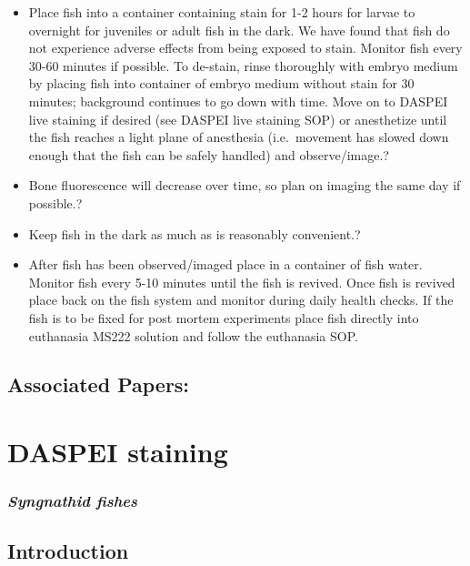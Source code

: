 \documentclass[
  letterpaper,
  DIV=11,
  numbers=noendperiod]{scrreprt}
\providecommand{\tightlist}{%
  \setlength{\itemsep}{0pt}\setlength{\parskip}{0pt}}\usepackage{longtable,booktabs,array}
\begin{document}
\begin{itemize}
\tightlist
\item
  Place fish into a container containing stain for 1-2 hours for larvae
  to overnight for juveniles or adult fish in the dark. We have found
  that fish do not experience adverse effects from being exposed to
  stain. Monitor fish every 30-60 minutes if possible. To de-stain,
  rinse thoroughly with embryo medium by placing fish into container of
  embryo medium without stain for 30 minutes; background continues to go
  down with time. Move on to DASPEI live staining if desired (see DASPEI
  live staining SOP) or anesthetize until the fish reaches a light plane
  of anesthesia (i.e.~movement has slowed down enough that the fish can
  be safely handled) and observe/image.?
\item
  Bone fluorescence will decrease over time, so plan on imaging the same
  day if possible.?
\item
  Keep fish in the dark as much as is reasonably convenient.?
\item
  After fish has been observed/imaged place in a container of fish
  water. Monitor fish every 5-10 minutes until the fish is revived. Once
  fish is revived place back on the fish system and monitor during daily
  health checks. If the fish is to be fixed for post mortem experiments
  place fish directly into euthanasia MS222 solution and follow the
  euthanasia SOP.
\end{itemize}

\hypertarget{associated-papers-41}{%
\section{Associated Papers:}\label{associated-papers-41}}

\hypertarget{sec-vert_exp-DASPEI}{%
\chapter{DASPEI staining}\label{sec-vert_exp-DASPEI}}

\hypertarget{syngnathid-fishes-2}{%
\subsection{\texorpdfstring{\emph{Syngnathid
fishes}}{Syngnathid fishes}}\label{syngnathid-fishes-2}}

\hypertarget{introduction-64}{%
\section{Introduction}\label{introduction-64}}
\end{document}
